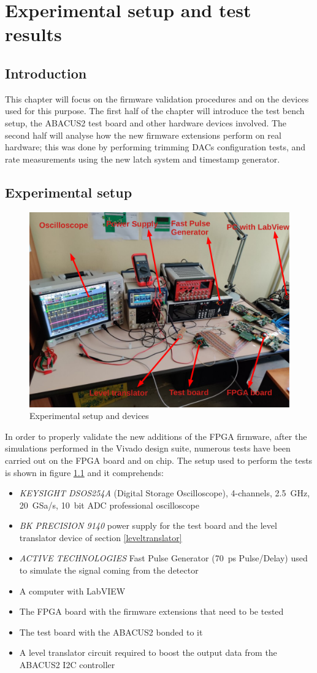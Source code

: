 \chapter{Experimental setup and test results}
\section{Introduction}
This chapter will focus on the firmware validation procedures and on the devices used for this purpose.
The first half of the chapter will introduce the test bench setup, the ABACUS2 test board and other hardware devices involved.
The second half will analyse how the new firmware extensions perform on real hardware; this was done by performing trimming DACs configuration tests, and rate measurements using the new latch system and timestamp generator.

\section{Experimental setup}\label{testbench}
\begin{figure}[H]
	\centering
	\includegraphics[width=0.7\linewidth]{IMG/ch5/TESTBENCH}
	\caption{Experimental setup and devices}
	\label{fig:testbench}
\end{figure}
In order to properly validate the new additions of the FPGA firmware, after the simulations performed in the Vivado design suite, numerous tests have been carried out on the FPGA board and on chip.
The setup used to perform the tests is shown in figure \ref{fig:testbench} and it comprehends:
\begin{itemize}
	\item \textit{KEYSIGHT DSOS254A} (Digital Storage Oscilloscope), 4-channels, 2.5~GHz, 20~GSa/s, 10~bit ADC professional oscilloscope
	\item \textit{BK PRECISION 9140} power supply for the test board and the level translator device of section \ref{leveltranslator}
	\item \textit{ACTIVE TECHNOLOGIES} Fast Pulse Generator (70~ps Pulse/Delay) used to simulate the signal coming from the detector
	\item A computer with LabVIEW 
	\item The FPGA board with the firmware extensions that need to be tested
	\item The test board with the ABACUS2 bonded to it
	\item A level translator circuit required to boost the output data from the ABACUS2 I2C controller
\end{itemize}

